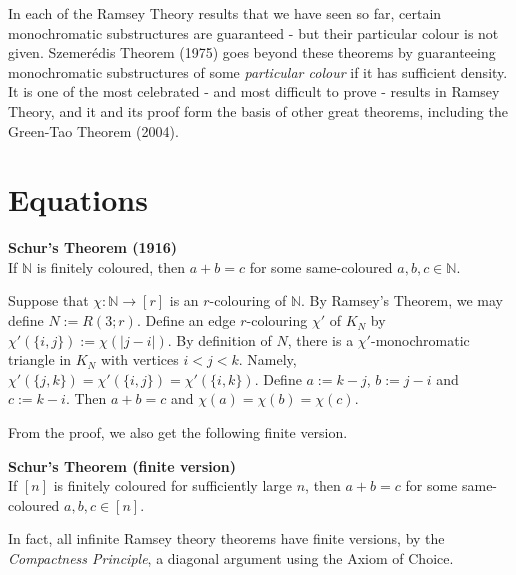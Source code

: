 \documentclass[a4paper]{article}
\let\oldendproof\endproof
\renewenvironment{proof}[1][\proofname]{%
  \oldproof[\scshape \noindent {\bfseries \text{Proof}}]%
}{\oldendproof}
\newenvironment{thm}[1]{
	\begin{framed}
	\noindent
	{\bfseries #1}\\}{
	\end{framed}
}
\begin{document}
In each of the Ramsey Theory results that we have seen so far,
certain monochromatic substructures are guaranteed - but their particular colour is not given.
Szemer\'edis Theorem (1975) goes beyond these theorems by
guaranteeing monochromatic substructures of some {\em particular colour} if it has sufficient density.
It is one of the most celebrated - and most difficult to prove - results
in Ramsey Theory, and it and its proof form the basis of other great theorems,
including the Green-Tao Theorem (2004).



\newpage
\section{Equations}

\begin{thm}{Schur's Theorem (1916)}
If $\mathbb{N}$ is finitely coloured,
then $a+b = c$ for some same-coloured $a,b,c \in \mathbb{N}$.
\end{thm}

\begin{proof}
Suppose that $\chi: \mathbb{N} \to [r]$ is an $r$-colouring of $\mathbb{N}$.
By Ramsey's Theorem, we may define $N:= R(3;r)$.
Define an edge $r$-colouring $\chi'$ of $K_N$ by $\chi' (\{i,j\}) := \chi(|j-i|)$.
By definition of $N$,
there is a $\chi'$-monochromatic triangle in $K_N$ with vertices $i < j < k$.
Namely, $\chi'(\{j,k\}) = \chi' (\{i,j\}) = \chi'(\{i,k\})$.
Define $a := k-j$, $b:= j-i$ and $c:= k-i$.
Then $a + b = c$ and $\chi(a) = \chi(b) = \chi(c)$.
\end{proof}

From the proof, we also get the following finite version.

\begin{thm}{Schur's Theorem (finite version)}
If $[n]$ is finitely coloured for sufficiently large $n$,
then $a + b = c$ for some same-coloured $a,b,c \in [n]$.
\end{thm}

In fact, all infinite Ramsey theory theorems have finite versions,
by the \emph{Compactness Principle},
a diagonal argument using the Axiom of Choice.
\end{document}
